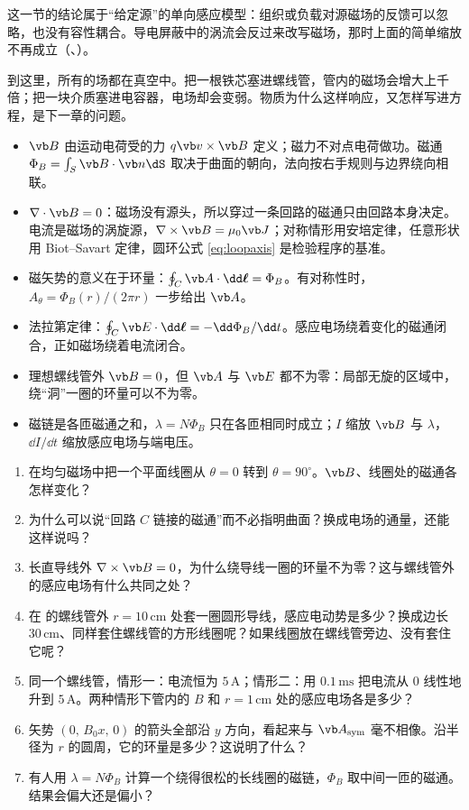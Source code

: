 这一节的结论属于“给定源”的单向感应模型：组织或负载对源磁场的反馈可以忽略，也没有容性耦合。导电屏蔽中的涡流会反过来改写磁场，那时上面的简单缩放不再成立（、）。

到这里，所有的场都在真空中。把一根铁芯塞进螺线管，管内的磁场会增大上千倍；把一块介质塞进电容器，电场却会变弱。物质为什么这样响应，又怎样写进方程，是下一章的问题。

\begin{takeaways}
\begin{itemize}
\item $\vb B$ 由运动电荷受的力 $q\vb v\times\vb B$ 定义；磁力不对点电荷做功。磁通 $\Phi_B=\int_S\vb B\cdot\vb n\dS$ 取决于曲面的朝向，法向按右手规则与边界绕向相联。
\item $\nabla\cdot\vb B=0$：磁场没有源头，所以穿过一条回路的磁通只由回路本身决定。电流是磁场的涡旋源，$\nabla\times\vb B=\mu_0\vb J$；对称情形用安培定律，任意形状用 Biot–Savart 定律，圆环公式 \eqref{eq:loopaxis} 是检验程序的基准。
\item 磁矢势的意义在于环量：$\oint_C\vb A\cdot\dd\boldsymbol\ell=\Phi_B$。有对称性时，$A_\theta=\Phi_B(r)/(2\pi r)$ 一步给出 $\vb A$。
\item 法拉第定律：$\oint_C\vb E\cdot\dd\boldsymbol\ell=-\dd\Phi_B/\dd t$。感应电场绕着变化的磁通闭合，正如磁场绕着电流闭合。
\item 理想螺线管外 $\vb B=0$，但 $\vb A$ 与 $\vb E$ 都不为零：局部无旋的区域中，绕“洞”一圈的环量可以不为零。
\item 磁链是各匝磁通之和，$\lambda=N\Phi_B$ 只在各匝相同时成立；$I$ 缩放 $\vb B$ 与 $\lambda$，$\dd I/\dd t$ 缩放感应电场与端电压。
\end{itemize}
\end{takeaways}

\begin{selfcheck}
\begin{enumerate}
\item 在均匀磁场中把一个平面线圈从 $\theta=0$ 转到 $\theta=90^\circ$。$\vb B$、线圈处的磁通各怎样变化？
\item 为什么可以说“回路 $C$ 链接的磁通”而不必指明曲面？换成电场的通量，还能这样说吗？
\item 长直导线外 $\nabla\times\vb B=0$，为什么绕导线一圈的环量不为零？这与螺线管外的感应电场有什么共同之处？
\item 在 的螺线管外 $r=10\,\mathrm{cm}$ 处套一圈圆形导线，感应电动势是多少？换成边长 $30\,\mathrm{cm}$、同样套住螺线管的方形线圈呢？如果线圈放在螺线管旁边、没有套住它呢？
\item 同一个螺线管，情形一：电流恒为 $5\,\mathrm A$；情形二：用 $0.1\,\mathrm{ms}$ 把电流从 0 线性地升到 $5\,\mathrm A$。两种情形下管内的 $B$ 和 $r=1\,\mathrm{cm}$ 处的感应电场各是多少？
\item 矢势 $(0,\,B_0x,\,0)$ 的箭头全部沿 $y$ 方向，看起来与 $\vb A_{\rm sym}$ 毫不相像。沿半径为 $r$ 的圆周，它的环量是多少？这说明了什么？
\item 有人用 $\lambda=N\Phi_B$ 计算一个绕得很松的长线圈的磁链，$\Phi_B$ 取中间一匝的磁通。结果会偏大还是偏小？
\end{enumerate}
\end{selfcheck}

